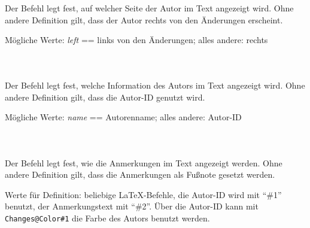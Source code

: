 \subsubsection{}
\DescribeMacro{\setauthormarkupposition}

Der Befehl  legt fest, auf welcher Seite der Autor im Text angezeigt wird.
Ohne andere Definition gilt, dass der Autor rechts von den Änderungen erscheint.

Mögliche Werte: \emph{left} == links von den Änderungen; alles andere: rechts

\begin{chusage}
		\>\\
	\usageexample
		\>
\end{chusage}



\subsubsection{}
\DescribeMacro{\setauthormarkuptext}

Der Befehl  legt fest, welche Information des Autors im Text angezeigt wird.
Ohne andere Definition gilt, dass die Autor-ID genutzt wird.

Mögliche Werte: \emph{name} == Autorenname; alles andere: Autor-ID

\begin{chusage}
		\>\\
	\usageexample
		\>
\end{chusage}



\subsubsection{}
\DescribeMacro{\setremarkmarkup}

Der Befehl  legt fest, wie die Anmerkungen im Text angezeigt werden.
Ohne andere Definition gilt, dass die Anmerkungen als Fußnote gesetzt werden.

Werte für Definition: beliebige \LaTeX-Befehle, die Autor-ID wird mit "`\#1"' benutzt, der Anmerkungstext mit "`\#2"'.
Über die Autor-ID kann mit \texttt{Changes@Color\#1} die Farbe des Autors benutzt werden.

